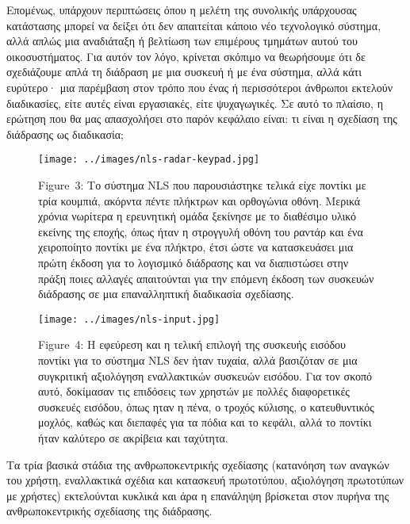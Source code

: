 \documentclass[
]{article}
\begin{document}
Επομένως, υπάρχουν περιπτώσεις όπου η μελέτη της συνολικής υπάρχουσας
κατάστασης μπορεί να δείξει ότι δεν απαιτείται κάποιο νέο τεχνολογικό
σύστημα, αλλά απλώς μια αναδιάταξη ή βελτίωση των επιμέρους τμημάτων
αυτού του οικοσυστήματος. Για αυτόν τον λόγο, κρίνεται σκόπιμο να
θεωρήσουμε ότι δε σχεδιάζουμε απλά τη διάδραση με μια συσκευή ή με ένα
σύστημα, αλλά κάτι ευρύτερο· μια παρέμβαση στον τρόπο που ένας ή
περισσότεροι άνθρωποι εκτελούν διαδικασίες, είτε αυτές είναι εργασιακές,
είτε ψυχαγωγικές. Σε αυτό το πλαίσιο, η ερώτηση που θα μας απασχολήσει
στο παρόν κεφάλαιο είναι: τι είναι η σχεδίαση της διάδρασης ως
διαδικασία;

\leavevmode{}%
\begin{figure}
\hypertarget{fig:nls-radar-keypad}{%
\centering
\texttt{[image: ../images/nls-radar-keypad.jpg]}
\caption{Figure~3: Το σύστημα NLS που παρουσιάστηκε τελικά είχε ποντίκι
με τρία κουμπιά, ακόρντα πέντε πλήκτρων και ορθογώνια οθόνη. Μερικά
χρόνια νωρίτερα η ερευνητική ομάδα ξεκίνησε με το διαθέσιμο υλικό
εκείνης της εποχής, όπως ήταν η στρογγυλή οθόνη του ραντάρ και ένα
χειροποίητο ποντίκι με ένα πλήκτρο, έτσι ώστε να κατασκευάσει μια πρώτη
έκδοση για το λογισμικό διάδρασης και να διαπιστώσει στην πράξη ποιες
αλλαγές απαιτούνται για την επόμενη έκδοση των συσκευών διάδρασης σε μια
επαναλληπτική διαδικασία σχεδίασης.}\label{fig:nls-radar-keypad}
}
\end{figure}

\leavevmode{}%
\begin{figure}
\hypertarget{fig:nls-input}{%
\centering
\texttt{[image: ../images/nls-input.jpg]}
\caption{Figure~4: Η εφεύρεση και η τελική επιλογή της συσκευής εισόδου
ποντίκι για το σύστημα NLS δεν ήταν τυχαία, αλλά βασιζόταν σε μια
συγκριτική αξιολόγηση εναλλακτικών συσκευών εισόδου. Για τον σκοπό αυτό,
δοκίμασαν τις επιδόσεις των χρηστών με πολλές διαφορετικές συσκευές
εισόδου, όπως ηταν η πένα, ο τροχός κύλισης, ο κατευθυντικός μοχλός,
καθώς και διεπαφές για τα πόδια και το κεφάλι, αλλά το ποντίκι ήταν
καλύτερο σε ακρίβεια και ταχύτητα.}\label{fig:nls-input}
}
\end{figure}

Τα τρία βασικά στάδια της ανθρωποκεντρικής σχεδίασης (κατανόηση των
αναγκών του χρήστη, εναλλακτικά σχέδια και κατασκευή πρωτοτύπου,
αξιολόγηση πρωτοτύπων με χρήστες) εκτελούνται κυκλικά και άρα η
επανάληψη βρίσκεται στον πυρήνα της ανθρωποκεντρικής σχεδίασης της
διάδρασης.
\end{document}
